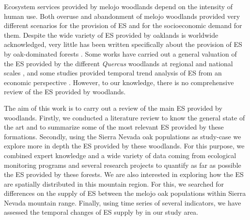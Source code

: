 Ecosystem services provided by melojo woodlands depend on the intensity of human use. Both overuse and abandonment of melojo woodlands provided very different scenarios for the provision of ES and for the socioeconomic demand for them. Despite the wide variety of ES provided by oaklands is worldwide acknowledged, very little has been written specifically about the provision of ES by oak-dominated forests \autocites{Maranonetal2012OakTrees,Maranonetal2012EstadoTendencia,MorenoLlorcaetal2012MontanaMediterranea}. Some works have carried out a general valuation of the ES provided by the different \emph{Quercus} woodlands at regional and national scales \autocite{SanMigueletal2012BosquesMatorrales,Maranonetal2012EstadoTendencia,Sousaetal2020EcosystemServices}, and some studies provided temporal trend analysis of ES from an economic perspective \autocites[see][for an example for woodland pastures of California and Spain]{Caparrosetal2013EconomicsEcosystem}. However, to our knowledge, there is no comprehensive review of the ES provided by \Qp woodlands. 

The aim of this work is to carry out a review of the main ES provided by \Qp woodlands. Firstly, we conducted a literature review to know the general state of the art and to summarize some of the most relevant ES provided by these formations. Secondly, using the Sierra Nevada oak populations as study-case we explore more in depth the ES provided by these woodlands. For this purpose, we combined expert knowledge and a wide variety of data coming from ecological monitoring programs and several research projects to quantify as far as possible the ES provided by these forests. We are also interested in exploring how the ES are spatially distributed in this mountain region. For this, we searched for differences on the supply of ES between the melojo oak populations within Sierra Nevada mountain range.  Finally, using time series of several indicators, we have assessed the temporal changes of ES supply by \Qp in our study area.  

